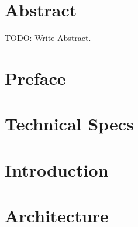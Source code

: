\documentclass[a4paper, 12pt]{report}
\begin{document}
    
    \pagestyle{fancy}
    \chapter*{Abstract}
    TODO: Write Abstract.


    \chapter*{Preface}
    

    \chapter*{Technical Specs}

    \tableofcontents
    \listoffigures
    \listoftables

    \chapter{Introduction}
    

    \chapter{Architecture}
    
\end{document}
